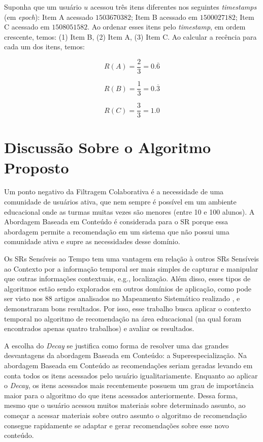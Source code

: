Suponha que um usuário $u$ acessou três itens diferentes nos seguintes \textit{timestamps} (em \textit{epoch}): Item A acessado $1503670382$;
Item B acessado em $1500027182$; Item C acessado em $1508051582$. Ao ordenar esses itens pelo \textit{timestamp}, em ordem
crescente, temos: (1) Item B, (2) Item A, (3) Item C. Ao calcular a recência para cada um dos itens, temos:

\begin{equation}
  R(A) = \frac{2}{3} = 0.\overline{6}
  \label{eq:recencia-item-a}
\end{equation}

\begin{equation}
  R(B) = \frac{1}{3} = 0.\overline{3}
  \label{eq:recencia-item-b}
\end{equation}

\begin{equation}
  R(C) = \frac{3}{3} = 1.0
  \label{eq:recencia-item-c}
\end{equation}

\section{Discussão Sobre o Algoritmo Proposto}

Um ponto negativo da Filtragem Colaborativa é a necessidade de uma comunidade de usuários ativa, que nem sempre é
possível em um ambiente educacional onde as turmas muitas vezes são menores (entre 10 e 100 alunos). A Abordagem Baseada
em Conteúdo é considerada para o SR porque essa abordagem permite a recomendação em um sistema que não possui uma
comunidade ativa e supre as necessidades desse domínio.

Os SRs Sensíveis ao Tempo tem uma vantagem em relação à outros SRs Sensíveis ao Contexto por a informação temporal ser
mais simples de capturar e manipular que outras informações contextuais, e.g., localização. Além disso, esses tipos de
algoritmos estão sendo explorados em outros domínios de aplicação, como pode ser visto nos 88 artigos analisados no
Mapeamento Sistemático realizado \cite{de2017time}, e demonstraram bons resultados. Por isso, esse trabalho busca
aplicar o contexto temporal no algoritmo de recomendação na área educacional (na qual foram encontrados apenas quatro
trabalhos) e avaliar os resultados.

A escolha do \textit{Decay} se justifica como forma de resolver uma das grandes desvantagens da abordagem Baseada em Conteúdo: a
Superespecialização. Na abordagem Baseada em Conteúdo as recomendações seriam geradas levando em conta todos os itens
acessados pelo usuário igualitariamente. Enquanto ao aplicar o \textit{Decay}, os itens acessados mais recentemente possuem um
grau de importância maior para o algoritmo do que itens acessados anteriormente. Dessa forma, mesmo que o usuário
acessou muitos materiais sobre determinado assunto, ao começar a acessar materiais sobre outro assunto o algoritmo de
recomendação consegue rapidamente se adaptar e gerar recomendações sobre esse novo conteúdo.

